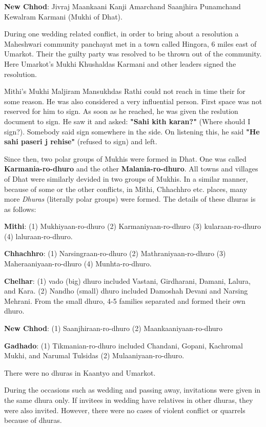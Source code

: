 \textbf{New Chhod}: Jivraj Maankaani
                    Kanji Amarchand Saanjhira
                    Punamchand Kewalram Karmani (Mukhi of Dhat).

During one wedding related conflict, in order to bring about a resolution a
Maheshwari community panchayat met in a town called Hingora, 6 miles east of
Umarkot. Their the guilty party was resolved to be thrown out of the community.
Here Umarkot's Mukhi Khushaldas Karmani and other leaders signed the
resolution.

Mithi's Mukhi Maljiram Mansukhdas Rathi could not reach in time their for some reason. He was also considered a very influential person. First space was not reserved for him to sign. As soon as he reached, he was given the reslution document to sign. He saw it and asked: \textbf{"Sahi kith karan?"} (Where should I sign?). Somebody said sign somewhere in the side. On listening this, he said \textbf{"He sahi paseri j rehise"} (refused to sign) and left.

Since then, two polar groups of Mukhis were formed in Dhat. One was called \textbf{Karmania-ro-dhuro} and the other \textbf{Malania-ro-dhuro}. All towns and villages of Dhat were similarly devided in two groups of Mukhis. In a similar manner, because of some or the other conflicts, in Mithi, Chhachhro etc. places, many more \textit{Dhuras} (literally polar groups) were formed. The details of these dhuras is as follows:

\textbf{Mithi}: (1) Mukhiyaan-ro-dhuro (2) Karmaniyaan-ro-dhuro (3) kularaan-ro-dhuro (4) laluraan-ro-dhuro.

\textbf{Chhachhro}: (1) Narsingraan-ro-dhuro (2) Mathraniyaan-ro-dhuro (3) Maheraaniyaan-ro-dhuro (4) Munhta-ro-dhuro.

\textbf{Chelhar}: (1) vado (big) dhuro included Vastani, Girdharani, Damani, Lalura, and Kara. (2) Nandho (small) dhuro included Damoshah Devani and Narsing Mehrani. From the small dhuro, 4-5 families separated and formed their own dhuro.

\textbf{New Chhod}: (1) Saanjhiraan-ro-dhuro (2) Maankaaniyaan-ro-dhuro

\textbf{Gadhado}: (1) Tikmanian-ro-dhuro included Chandani, Gopani, Kachromal Mukhi, and Narumal Tulsidas (2) Mulaaniyaan-ro-dhuro.

There were no dhuras in Kaantyo and Umarkot.

During the occasions such as wedding and passing away, invitations were given in the same dhura only. If invitees in wedding have relatives in other dhuras, they were also invited. However, there were no cases of violent conflict or quarrels because of dhuras.
